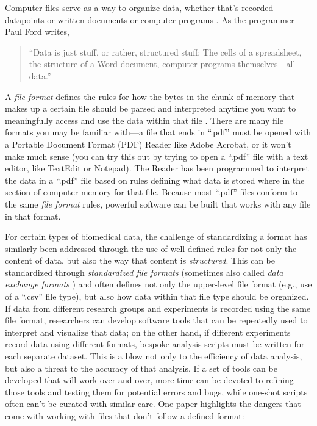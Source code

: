 \documentclass[]{tufte-book}
\begin{document}
Computer files serve as a way to organize data, whether that's recorded
datapoints or written documents or computer programs \citep{kernighan1984unix}. As
the programmer Paul Ford writes,

\begin{quote}
``Data is just stuff, or rather, structured stuff: The cells of a spreadsheet,
the structure of a Word document, computer programs themselves---all data.''
\citep{ford2015i}
\end{quote}

\noindent A \emph{file format} defines the rules for how the bytes in the chunk of
memory that makes up a certain file should be parsed and interpreted anytime you
want to meaningfully access and use the data within that file
\citep{murrell2009introduction}. There are many file formats you may be familiar
with---a file that ends in ``.pdf'' must be opened with a Portable Document Format
(PDF) Reader like Adobe Acrobat, or it won't make much sense (you can try this
out by trying to open a ``.pdf'' file with a text editor, like TextEdit or
Notepad). The Reader has been programmed to interpret the data in a ``.pdf'' file
based on rules defining what data is stored where in the section of computer
memory for that file. Because most ``.pdf'' files conform to the same \emph{file
format} rules, powerful software can be built that works with any file in that
format.

For certain types of biomedical data, the challenge of standardizing a format
has similarly been addressed through the use of well-defined rules for not only
the content of data, but also the way that content is \emph{structured}. This can be
standardized through \emph{standardized file formats} (sometimes also called \emph{data
exchange formats} \citep{brazma2006standards}) and often defines not only the
upper-level file format (e.g., use of a ``.csv'' file type), but also how data
within that file type should be organized. If data from different research
groups and experiments is recorded using the same file format, researchers can
develop software tools that can be repeatedly used to interpret and visualize
that data; on the other hand, if different experiments record data using
different formats, bespoke analysis scripts must be written for each separate
dataset. This is a blow not only to the efficiency of data analysis, but also a
threat to the accuracy of that analysis. If a set of tools can be developed that
will work over and over, more time can be devoted to refining those tools and
testing them for potential errors and bugs, while one-shot scripts often can't
be curated with similar care. One paper highlights the dangers that come with
working with files that don't follow a defined format:
\end{document}
